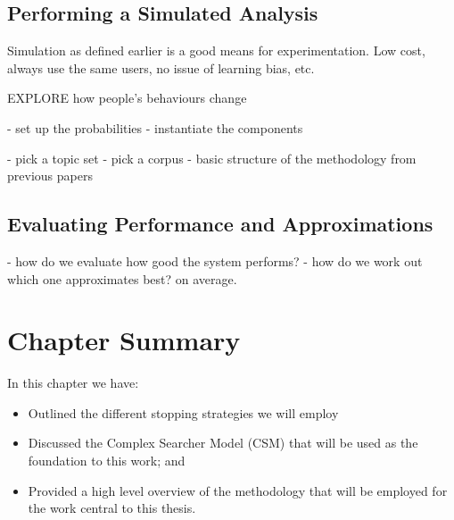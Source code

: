 \subsection{Performing a Simulated Analysis}\label{sec:proposal:method:simulations}
Simulation as defined earlier is a good means for experimentation.
Low cost, always use the same users, no issue of learning bias, etc.

EXPLORE how people's behaviours change

- set up the probabilities
- instantiate the components

- pick a topic set
- pick a corpus
- basic structure of the methodology from previous papers

\subsection{Evaluating Performance and Approximations}
- how do we evaluate how good the system performs?
- how do we work out which one approximates best? on average.



\section{Chapter Summary}
In this chapter we have:

\begin{itemize}
    
    \item{Outlined the different stopping strategies we will employ}
    \item{Discussed the Complex Searcher Model (CSM) that will be used as the foundation to this work; and}
    \item{Provided a high level overview of the methodology that will be employed for the work central to this thesis.}
    
\end{itemize}